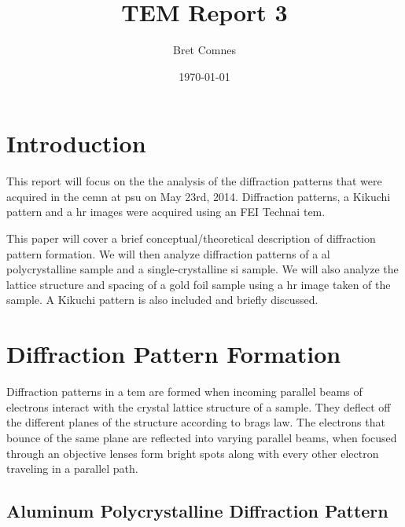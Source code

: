 \documentclass[12pt,a4paper]{article}
\title{TEM Report 3}
\author{Bret Comnes}
\date{\today}
\begin{document}
\maketitle

\section{Introduction} %

This report will focus on the the analysis of the diffraction patterns that were acquired in the \ac{cemn} at \ac{psu} on May 23rd, 2014.  Diffraction patterns, a Kikuchi pattern and a \ac{hr} images were acquired using an FEI Technai \ac{tem}.

This paper will cover a brief conceptual/theoretical description of diffraction pattern formation.  We will then analyze diffraction patterns of a \ac{al} polycrystalline sample and a single-crystalline \ac{si} sample.  We will also analyze the lattice structure and spacing of a gold foil sample using a \ac{hr} image taken of the sample.  A Kikuchi pattern is also included and briefly discussed.

\section{Diffraction Pattern Formation} %
\label{sec:diffraction_pattern_formation}

Diffraction patterns in a \ac{tem} are formed when incoming parallel beams of electrons interact with the crystal lattice structure of a sample.  They deflect off the different planes of the structure according to brags law.  The electrons that bounce of the same plane are reflected into varying parallel beams, when focused through an objective lenses form bright spots along with every other electron traveling in a parallel path.   

\lipsum[20]


\subsection{Aluminum Polycrystalline Diffraction Pattern} %
\label{sub:poly}

\lipsum[20]
\end{document}
